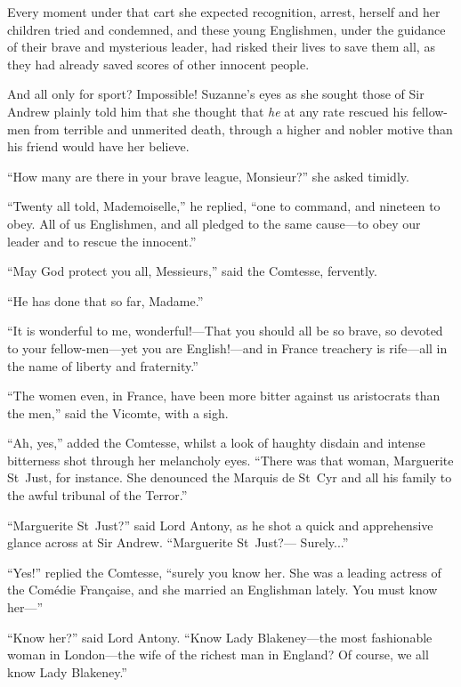 Every moment under that cart she expected recognition, arrest, herself and her children tried and condemned, and these young Englishmen, under the guidance of their brave and mysterious leader, had risked their lives to save them all, as they had already saved scores of other innocent people.

And all only for sport? Impossible! Suzanne's eyes as she sought those of Sir Andrew plainly told him that she thought that \textit{he} at any rate rescued his fellow-men from terrible and unmerited death, through a higher and nobler motive than his friend would have her believe.

\enquote{How many are there in your brave league, Monsieur?} she asked timidly.

\enquote{Twenty all told, Mademoiselle,} he replied, \enquote{one to command, and nineteen to obey. All of us Englishmen, and all pledged to the same cause---to obey our leader and to rescue the innocent.}

\enquote{May God protect you all, Messieurs,} said the Comtesse, fervently.

\enquote{He has done that so far, Madame.}

\enquote{It is wonderful to me, wonderful!---That you should all be so brave, so devoted to your fellow-men---yet you are English!---and in France treachery is rife---all in the name of liberty and fraternity.}

\enquote{The women even, in France, have been more bitter against us aristocrats than the men,} said the Vicomte, with a sigh.

\enquote{Ah, yes,} added the Comtesse, whilst a look of haughty disdain and intense bitterness shot through her melancholy eyes. \enquote{There was that woman, Marguerite St~Just, for instance. She denounced the Marquis de St~Cyr and all his family to the awful tribunal of the Terror.}

\enquote{Marguerite St~Just?} said Lord Antony, as he shot a quick and apprehensive glance across at Sir Andrew. \enquote{Marguerite St~Just?--- Surely...}

\enquote{Yes!} replied the Comtesse, \enquote{surely you know her. She was a leading actress of the Comédie Française, and she married an Englishman lately. You must know her---}

\enquote{Know her?} said Lord Antony. \enquote{Know Lady Blakeney---the most fashionable woman in London---the wife of the richest man in England? Of course, we all know Lady Blakeney.}

